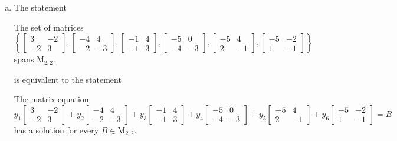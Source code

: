 \begin{exerciseAnswer}
\begin{enumerate}[(a)]
\item The statement 
\begin{center}\begin{minipage}{0.8\textwidth}
 The set of matrices \( \left\{ \left[\begin{array}{cc}
3 & -2 \\
-2 & 3
\end{array}\right] , \left[\begin{array}{cc}
-4 & 4 \\
-2 & -3
\end{array}\right] , \left[\begin{array}{cc}
-1 & 4 \\
-1 & 3
\end{array}\right] , \left[\begin{array}{cc}
-5 & 0 \\
-4 & -3
\end{array}\right] , \left[\begin{array}{cc}
-5 & 4 \\
2 & -1
\end{array}\right] , \left[\begin{array}{cc}
-5 & -2 \\
1 & -1
\end{array}\right] \right\} \) spans \(\mathrm{M}_{2,2}\). 
\end{minipage}\end{center}
     is equivalent to the statement 
\begin{center}\begin{minipage}{0.8\textwidth}
 The matrix equation \[ y_{1} \left[\begin{array}{cc}
3 & -2 \\
-2 & 3
\end{array}\right] + y_{2} \left[\begin{array}{cc}
-4 & 4 \\
-2 & -3
\end{array}\right] + y_{3} \left[\begin{array}{cc}
-1 & 4 \\
-1 & 3
\end{array}\right] + y_{4} \left[\begin{array}{cc}
-5 & 0 \\
-4 & -3
\end{array}\right] + y_{5} \left[\begin{array}{cc}
-5 & 4 \\
2 & -1
\end{array}\right] + y_{6} \left[\begin{array}{cc}
-5 & -2 \\
1 & -1
\end{array}\right] =B\] has a solution for every \(B \in \mathrm{M}_{2,2}\). 
\end{minipage}\end{center}
    

\end{enumerate}
\end{exerciseAnswer}
